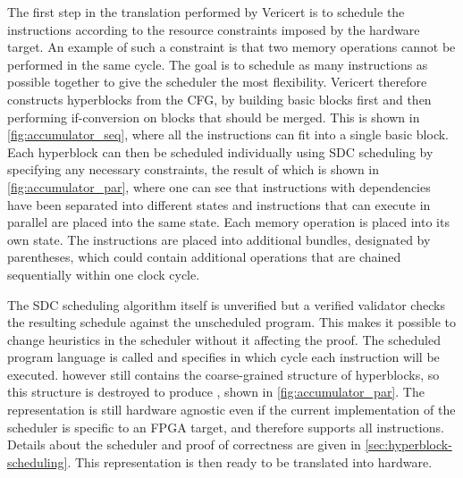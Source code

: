 The first step in the translation performed by Vericert is to schedule the
instructions according to the resource constraints imposed by the hardware
target.  An example of such a constraint is that two memory operations cannot be
performed in the same cycle.  The goal is to schedule as many instructions as
possible together to give the scheduler the most flexibility.  Vericert
therefore constructs hyperblocks from the \rtl{} \gls{CFG}, by building basic
blocks first and then performing \gls{if-conversion} on blocks that should be merged.
This is shown in \cref{fig:accumulator_seq}, where all the instructions can fit
into a single basic block.  Each hyperblock can then be scheduled individually
using \gls{SDC} scheduling by specifying any necessary constraints, the result
of which is shown in \cref{fig:accumulator_par}, where one can see that
instructions with dependencies have been separated into different states and
instructions that can execute in parallel are placed into the same state.  Each
memory operation is placed into its own state.  The instructions are placed into
additional bundles, designated by parentheses, which could contain additional
operations that are chained sequentially within one clock cycle.

The \gls{SDC} scheduling algorithm itself is unverified but a verified validator
checks the resulting schedule against the unscheduled program.  This makes it
possible to change heuristics in the scheduler without it affecting the proof.
The scheduled program language is called \rtlpar{} and specifies in which cycle
each instruction will be executed.  \rtlpar{} however still contains the
coarse-grained structure of hyperblocks, so this structure is destroyed to
produce \rtlsubpar{}, shown in \cref{fig:accumulator_par}.  The representation
is still hardware agnostic even if the current implementation of the scheduler
is specific to an \gls{FPGA} target, and therefore supports all \rtl{}
instructions.  Details about the scheduler and proof of correctness are given in
\cref{sec:hyperblock-scheduling}.  This representation is then ready to be
translated into hardware.

